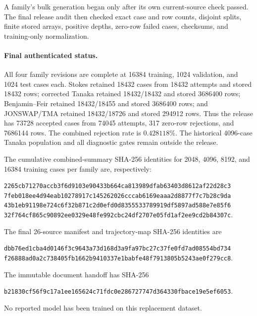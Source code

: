 \documentclass[10pt]{article}
\begin{document}
A family's bulk generation began only after its own current-source check
passed.  The final release audit then checked exact case and row counts,
disjoint splits, finite stored arrays, positive depths, zero-row failed cases,
checksums, and training-only normalization.

\paragraph{Final authenticated status.}
All four family revisions are complete at 16384 training, 1024 validation,
and 1024 test cases each.  Stokes retained 18432 cases from 18432 attempts and
stored 18432 rows; corrected Tanaka retained 18432/18432 and stored 3686400
rows; Benjamin--Feir retained 18432/18455 and stored 3686400 rows; and
JONSWAP/TMA retained 18432/18726 and stored 294912 rows.  Thus the release has
73728 accepted cases from 74045 attempts, 317 zero-row rejections, and
7686144 rows.  The combined rejection rate is \(0.428118\%\).  The
historical 4096-case Tanaka population and all diagnostic gates remain outside
the release.

The cumulative combined-summary SHA-256 identities for 2048, 4096, 8192, and
16384 training cases per family are, respectively:
\begin{center}
\small
\texttt{2265cb71270accb3f6d9103e90433b664ca813989dfab63403d8612af22d28c3}\\
\texttt{7feb018ee4d94eab10278917c145262026cccab6169eaaa2d8877f7c7b28c9da}\\
\texttt{43b1eb91198e724c6f32b871c2d0efd0d8355533789919df5897ad588e7e85f6}\\
\texttt{32f764cf865c90892ee0329e48fe992cbc24df2707e05fd1af2ee9cd2b84307c}.
\end{center}
The final 26-source manifest and trajectory-map SHA-256 identities are
\begin{center}
\small
\texttt{dbb76ed1cba4d0146f3c9643a73d168d3a9fa97bc27c37fe0fd7ad08554bd734}\\
\texttt{f26888ad0a2c738405fb1662b9410337e1babfe48f7913805b5243ae0f279cc8}.
\end{center}
The immutable document handoff has SHA-256
\begin{center}
\small
\texttt{b21830cf56f9c17a1ee165624c71fdc0e286727747d364330fbace19e5ef6053}.
\end{center}
No reported model has been trained on this replacement dataset.
\end{document}
